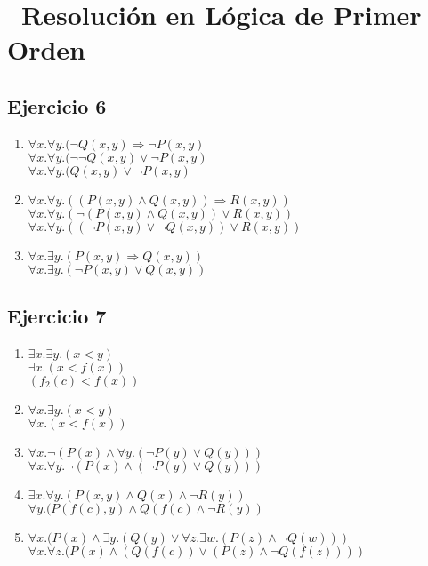 \documentclass[10pt,a4paper]{article}
\begin{document}
\section*{\ Resolución en Lógica de Primer Orden}
  \subsection{Ejercicio 6}
    \begin{enumerate}
    \item $\forall x.  \forall y. ( \neg Q(x,y) \Rightarrow \neg P(x,y)$ \\
    $\forall x.  \forall y. ( \neg \neg Q(x,y) \vee \neg P(x,y)$ \\
    $\forall x.  \forall y. ( Q(x,y) \vee \neg P(x,y)$
    \item $\forall x.  \forall y. ((P(x,y) \wedge Q(x,y)) \Rightarrow R(x,y))$ \\
    $\forall x.  \forall y. (\neg (P(x,y) \wedge Q(x,y)) \vee R(x,y))$ \\
    $\forall x.  \forall y. ((\neg P(x,y) \vee \neg Q(x,y)) \vee R(x,y))$
    \item $\forall x.  \exists y. (P(x,y) \Rightarrow Q(x,y))$ \\
    $\forall x.  \exists y. (\neg P(x,y) \vee Q(x,y))$
    \end{enumerate}
  \subsection{Ejercicio 7}
\begin{enumerate}
\item 
$\exists x. \exists y. (x<y)$ \\
$\exists x. (x<f(x))$ \\
$(f_{2}(c)<f(x))$
\item 
$\forall x. \exists y. (x<y)$ \\
$\forall x. (x<f(x))$
\item 
$\forall x. \neg(P(x) \wedge \forall y.(\neg P(y) \vee Q(y)))$ \\
$\forall x. \forall y. \neg(P(x) \wedge (\neg P(y) \vee Q(y)))$
\item 
$\exists x. \forall y. (P(x,y) \wedge Q(x) \wedge \neg R(y))$ \\
$\forall y. (P(f(c),y) \wedge Q(f(c) \wedge \neg R(y))$
\item 
$\forall x. (P(x) \wedge \exists y. (Q(y) \vee \forall z. \exists w. (P(z) \wedge \neg Q(w)))$ \\
$\forall x. \forall z. (P(x) \wedge (Q(f(c)) \vee (P(z) \wedge \neg Q(f(z))))$
\end{enumerate}
\end{document}
